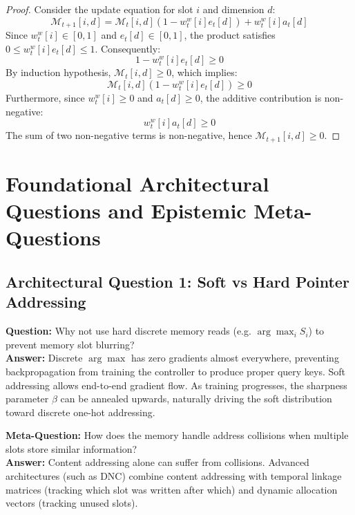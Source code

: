 \documentclass[11pt,a4paper]{article}
\theoremstyle{definition}
\begin{document}
\begin{proof}
Consider the update equation for slot $i$ and dimension $d$:
{\boldmath
\begin{equation}
\mathcal{M}_{t+1}[i, d] = \mathcal{M}_t[i, d] \left( 1 - w_t^w[i] e_t[d] \right) + w_t^w[i] a_t[d]
\end{equation}
}
Since $w_t^w[i] \in [0, 1]$ and $e_t[d] \in [0, 1]$, the product satisfies $0 \le w_t^w[i] e_t[d] \le 1$.
Consequently:
{\boldmath
\begin{equation}
1 - w_t^w[i] e_t[d] \ge 0
\end{equation}
}
By induction hypothesis, $\mathcal{M}_t[i, d] \ge 0$, which implies:
{\boldmath
\begin{equation}
\mathcal{M}_t[i, d] \left( 1 - w_t^w[i] e_t[d] \right) \ge 0
\end{equation}
}
Furthermore, since $w_t^w[i] \ge 0$ and $a_t[d] \ge 0$, the additive contribution is non-negative:
{\boldmath
\begin{equation}
w_t^w[i] a_t[d] \ge 0
\end{equation}
}
The sum of two non-negative terms is non-negative, hence $\mathcal{M}_{t+1}[i, d] \ge 0$.
\end{proof}

\section{Foundational Architectural Questions and Epistemic Meta-Questions}

\subsection{Architectural Question 1: Soft vs Hard Pointer Addressing}
\textbf{Question:} Why not use hard discrete memory reads (e.g. $\arg\max_i S_i$) to prevent memory slot blurring?\\
\textbf{Answer:} Discrete $\arg\max$ has zero gradients almost everywhere, preventing backpropagation from training the controller to produce proper query keys. Soft addressing allows end-to-end gradient flow. As training progresses, the sharpness parameter $\beta$ can be annealed upwards, naturally driving the soft distribution toward discrete one-hot addressing.

\textbf{Meta-Question:} How does the memory handle address collisions when multiple slots store similar information?\\
\textbf{Answer:} Content addressing alone can suffer from collisions. Advanced architectures (such as DNC) combine content addressing with temporal linkage matrices (tracking which slot was written after which) and dynamic allocation vectors (tracking unused slots).
\end{document}
